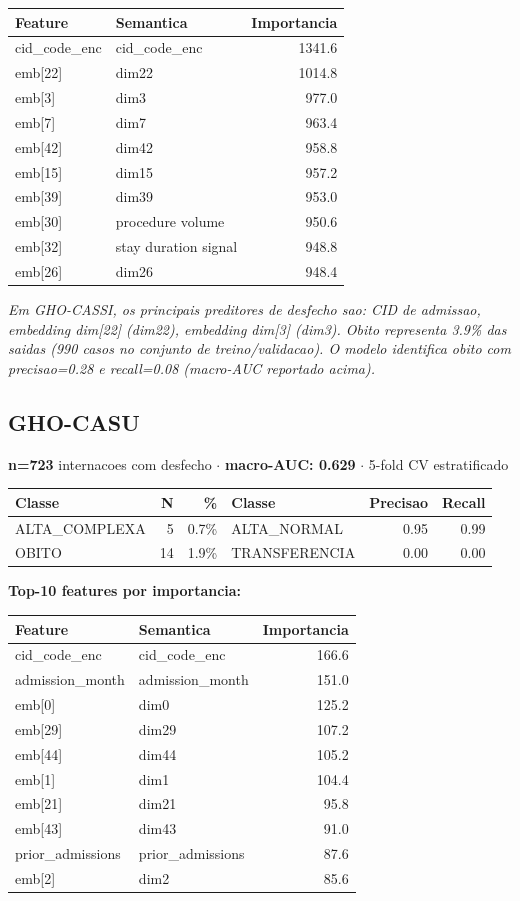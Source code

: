 \documentclass[11pt,a4paper]{article}
\begin{document}
\begin{tabular}{llr}
\toprule
Feature & Semantica & Importancia \\
\midrule
cid\_code\_enc & cid\_code\_enc & 1341.6 \\
emb[22] & dim22 & 1014.8 \\
emb[3] & dim3 & 977.0 \\
emb[7] & dim7 & 963.4 \\
emb[42] & dim42 & 958.8 \\
emb[15] & dim15 & 957.2 \\
emb[39] & dim39 & 953.0 \\
emb[30] & procedure volume & 950.6 \\
emb[32] & stay duration signal & 948.8 \\
emb[26] & dim26 & 948.4 \\
\bottomrule
\end{tabular}

\vspace{4pt}\noindent\textit{Em GHO-CASSI, os principais preditores de desfecho sao: CID de admissao, embedding dim[22] (dim22), embedding dim[3] (dim3). Obito representa 3.9\% das saidas (990 casos no conjunto de treino/validacao). O modelo identifica obito com precisao=0.28 e recall=0.08 (macro-AUC reportado acima).}

\subsection{GHO-CASU}
\textbf{n=723} internacoes com desfecho $\cdot$ \textbf{macro-AUC: 0.629} $\cdot$ 5-fold CV estratificado

\begin{tabular}{lrr|lrr}
\toprule
Classe & N & \% & Classe & Precisao & Recall \\
\midrule
ALTA\_COMPLEXA & 5 & 0.7\% & ALTA\_NORMAL & 0.95 & 0.99 \\
OBITO & 14 & 1.9\% & TRANSFERENCIA & 0.00 & 0.00 \\
\bottomrule
\end{tabular}

\vspace{4pt}\noindent\textbf{Top-10 features por importancia:}

\begin{tabular}{llr}
\toprule
Feature & Semantica & Importancia \\
\midrule
cid\_code\_enc & cid\_code\_enc & 166.6 \\
admission\_month & admission\_month & 151.0 \\
emb[0] & dim0 & 125.2 \\
emb[29] & dim29 & 107.2 \\
emb[44] & dim44 & 105.2 \\
emb[1] & dim1 & 104.4 \\
emb[21] & dim21 & 95.8 \\
emb[43] & dim43 & 91.0 \\
prior\_admissions & prior\_admissions & 87.6 \\
emb[2] & dim2 & 85.6 \\
\bottomrule
\end{tabular}
\end{document}
